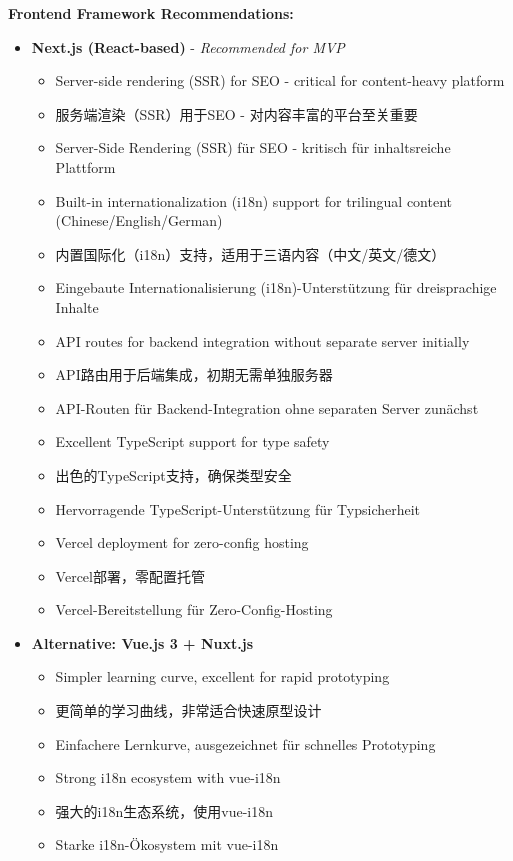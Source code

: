\textbf{Frontend Framework Recommendations:}
\begin{itemize}
    \item \textbf{Next.js (React-based)} - \textit{Recommended for MVP}
    \begin{itemize}
        \item Server-side rendering (SSR) for SEO - critical for content-heavy platform
        \item 服务端渲染（SSR）用于SEO - 对内容丰富的平台至关重要
        \item Server-Side Rendering (SSR) für SEO - kritisch für inhaltsreiche Plattform
        \item Built-in internationalization (i18n) support for trilingual content (Chinese/English/German)
        \item 内置国际化（i18n）支持，适用于三语内容（中文/英文/德文）
        \item Eingebaute Internationalisierung (i18n)-Unterstützung für dreisprachige Inhalte
        \item API routes for backend integration without separate server initially
        \item API路由用于后端集成，初期无需单独服务器
        \item API-Routen für Backend-Integration ohne separaten Server zunächst
        \item Excellent TypeScript support for type safety
        \item 出色的TypeScript支持，确保类型安全
        \item Hervorragende TypeScript-Unterstützung für Typsicherheit
        \item Vercel deployment for zero-config hosting
        \item Vercel部署，零配置托管
        \item Vercel-Bereitstellung für Zero-Config-Hosting
    \end{itemize}
    
    \item \textbf{Alternative: Vue.js 3 + Nuxt.js}
    \begin{itemize}
        \item Simpler learning curve, excellent for rapid prototyping
        \item 更简单的学习曲线，非常适合快速原型设计
        \item Einfachere Lernkurve, ausgezeichnet für schnelles Prototyping
        \item Strong i18n ecosystem with vue-i18n
        \item 强大的i18n生态系统，使用vue-i18n
        \item Starke i18n-Ökosystem mit vue-i18n
    \end{itemize}
    

\end{itemize}

